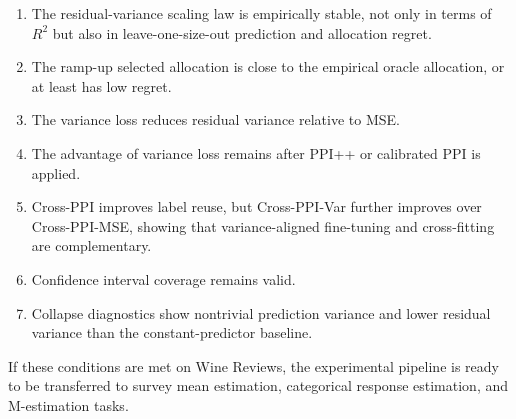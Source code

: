 \documentclass[11pt]{article}
\begin{document}
\begin{enumerate}
    \item The residual-variance scaling law is empirically stable, not only in terms of $R^2$ but also in leave-one-size-out prediction and allocation regret.
    \item The ramp-up selected allocation is close to the empirical oracle allocation, or at least has low regret.
    \item The variance loss reduces residual variance relative to MSE.
    \item The advantage of variance loss remains after PPI++ or calibrated PPI is applied.
    \item Cross-PPI improves label reuse, but Cross-PPI-Var further improves over Cross-PPI-MSE, showing that variance-aligned fine-tuning and cross-fitting are complementary.
    \item Confidence interval coverage remains valid.
    \item Collapse diagnostics show nontrivial prediction variance and lower residual variance than the constant-predictor baseline.
\end{enumerate}

If these conditions are met on Wine Reviews, the experimental pipeline is ready to be transferred to survey mean estimation, categorical response estimation, and M-estimation tasks.
\end{document}
